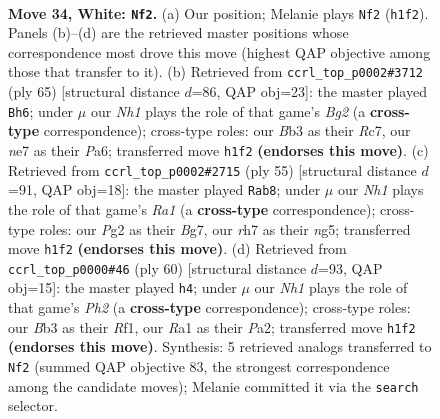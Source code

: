 \documentclass[11pt]{article}
\begin{document}
\clearpage

\begin{figure}[p]\centering
\begin{subfigure}{0.46\textwidth}\centering
\resizebox{\linewidth}{!}{%
\newchessgame
\chessboard[
  setfen={3r1b2/2nkn1pr/6b1/7p/4pP1P/PB4R1/6P1/R2K2NN w - - 1 34},
  showmover=false,
  pgfstyle=straightmove, color=movearrow, markmove={h1-f2}
]}
\caption{}
\end{subfigure}\hfill
\begin{subfigure}{0.46\textwidth}\centering
\resizebox{\linewidth}{!}{%
\newchessgame
\chessboard[
  setfen={2r4k/1pr3bp/p2p1n2/3P1P2/4B3/1P1N1P1P/P4R2/1K1R4 b - - 0 33},
  showmover=false,
  pgfstyle=straightmove, color=movearrow, markmove={g7-h6}
]}
\caption{}
\end{subfigure}
\\[4pt]
\begin{subfigure}{0.46\textwidth}\centering
\resizebox{\linewidth}{!}{%
\newchessgame
\chessboard[
  setfen={r3r1k1/6bp/2p3p1/6N1/8/1Pn1B1P1/3R1P1P/5RK1 b - - 0 28},
  showmover=false,
  pgfstyle=straightmove, color=movearrow, markmove={a8-b8}
]}
\caption{}
\end{subfigure}\hfill
\begin{subfigure}{0.46\textwidth}\centering
\resizebox{\linewidth}{!}{%
\newchessgame
\chessboard[
  setfen={r6r/pppk4/2bnp3/6B1/3P4/8/PP2B2P/2R1KR2 w - - 1 31},
  showmover=false,
  pgfstyle=straightmove, color=movearrow, markmove={h2-h4}
]}
\caption{}
\end{subfigure}
\caption{\textbf{Move 34, White: \texttt{Nf2}.} (a) Our position; Melanie plays \texttt{Nf2} (\texttt{h1f2}). Panels (b)--(d) are the retrieved master positions whose correspondence most drove this move (highest QAP objective among those that transfer to it). (b) Retrieved from \texttt{ccrl\_top\_p0002\#3712} (ply 65) [structural distance $d$=86, QAP obj=23]: the master played \texttt{Bh6}; under $\mu$ our \emph{Nh1} plays the role of that game's \emph{Bg2} (a \textbf{cross-type} correspondence); cross-type roles: our \emph{B}b3 as their \emph{R}c7, our \emph{n}e7 as their \emph{P}a6; transferred move \texttt{h1f2} \textbf{(endorses this move)}. (c) Retrieved from \texttt{ccrl\_top\_p0002\#2715} (ply 55) [structural distance $d$=91, QAP obj=18]: the master played \texttt{Rab8}; under $\mu$ our \emph{Nh1} plays the role of that game's \emph{Ra1} (a \textbf{cross-type} correspondence); cross-type roles: our \emph{P}g2 as their \emph{B}g7, our \emph{r}h7 as their \emph{n}g5; transferred move \texttt{h1f2} \textbf{(endorses this move)}. (d) Retrieved from \texttt{ccrl\_top\_p0000\#46} (ply 60) [structural distance $d$=93, QAP obj=15]: the master played \texttt{h4}; under $\mu$ our \emph{Nh1} plays the role of that game's \emph{Ph2} (a \textbf{cross-type} correspondence); cross-type roles: our \emph{B}b3 as their \emph{R}f1, our \emph{R}a1 as their \emph{P}a2; transferred move \texttt{h1f2} \textbf{(endorses this move)}. Synthesis: 5 retrieved analogs transferred to \texttt{Nf2} (summed QAP objective 83, the strongest correspondence among the candidate moves); Melanie committed it via the \texttt{search} selector.}
\label{fig:thought-m66}
\end{figure}
\end{document}
